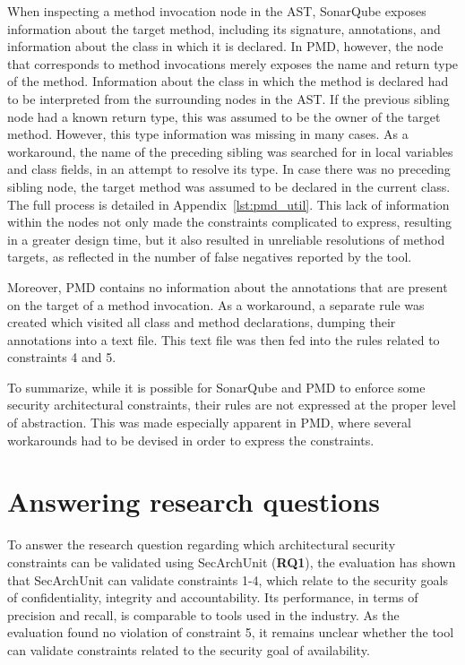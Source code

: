 When inspecting a method invocation node in the AST, SonarQube exposes information about the target method, including its signature, annotations, and information about the class in which it is declared. In PMD, however, the node that corresponds to method invocations merely exposes the name and return type of the method. Information about the class in which the method is declared had to be interpreted from the surrounding nodes in the AST. If the previous sibling node had a known return type, this was assumed to be the owner of the target method. However, this type information was missing in many cases. As a workaround, the name of the preceding sibling was searched for in local variables and class fields, in an attempt to resolve its type. In case there was no preceding sibling node, the target method was assumed to be declared in the current class. The full process is detailed in Appendix~\ref{lst:pmd_util}. This lack of information within the nodes not only made the constraints complicated to express, resulting in a greater design time, but it also resulted in unreliable resolutions of method targets, as reflected in the number of false negatives reported by the tool.

Moreover, PMD contains no information about the annotations that are present on the target of a method invocation. As a workaround, a separate rule was created which visited all class and method declarations, dumping their annotations into a text file. This text file was then fed into the rules related to constraints 4 and 5.

To summarize, while it is possible for SonarQube and PMD to enforce some security architectural constraints, their rules are not expressed at the proper level of abstraction. This was made especially apparent in PMD, where several workarounds had to be devised in order to express the constraints.



\section{Answering research questions}
To answer the research question regarding which architectural security constraints can be validated using SecArchUnit (\textbf{RQ1}), the evaluation has shown that SecArchUnit can validate constraints 1-4, which relate to the security goals of confidentiality, integrity and accountability. Its performance, in terms of precision and recall, is comparable to tools used in the industry. As the evaluation found no violation of constraint 5, it remains unclear whether the tool can validate constraints related to the security goal of availability.

